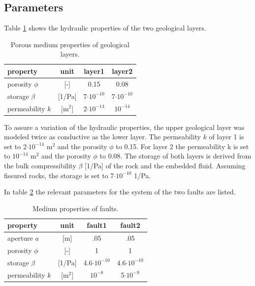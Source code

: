 \subsection{Parameters}

Table \ref{tab:layers} shows the hydraulic properties of the two geological layers.
\begin{table}[htbp]
    \begin{center}
        \caption{Porous medium properties of geological layers.}
        \begin{tabular}{lccc}
          \hline
          property & unit & layer1 & layer2\\
          \hline
          \hline
          porosity $\phi{}$ & [-] & 0.15 & 0.08\\
          storage $\beta{}$ & [1/Pa] & 7$\cdot10^{-10}$ & 7$\cdot10^{-10}$\\
          permeability $k$ & [m$^{2}$] & 2$\cdot10^{-14}$ & $10^{-14}$\\
          \hline
        \end{tabular}
        \label{tab:layers}
    \end{center}
\end{table}

To assure a variation of the hydraulic properties, the upper geological layer was modeled twice as conductive as the lower layer. The permeability $k$ of layer 1 is set to 2$\cdot10^{-14}$ m$^{2}$ and the porosity  $\phi{}$ to 0.15. For layer 2 the permeability k is set to $10^{-14}$ m$^{2}$ and the porosity $\phi{}$ to 0.08. The storage of both layers is derived from the bulk compressibility $\beta{}$ [1/Pa] of the rock and the embedded fluid. Assuming fissured rocks, the storage is set to 7$\cdot10^{-10}$ 1/Pa.

In table \ref{tab:faults} the relevant parameters for the system of the two faults are listed.
\begin{table}[htbp]
    \begin{center}
        \caption{Medium properties of faults.}
        \begin{tabular}{lccc}
          \hline
          property & unit & fault1 & fault2\\
          \hline
          \hline
          aperture $a$ & [m] & .05 & .05\\
          porosity $\phi{}$ & [-] & 1 & 1\\
          storage $\beta{}$ & [1/Pa] & 4.6$\cdot10^{-10}$ & 4.6$\cdot10^{-10}$\\
          permeability $k$ & [m$^2$] & $10^{-8}$ & 5$\cdot10^{-9}$\\
          \hline
        \end{tabular}
        \label{tab:faults}
    \end{center}
\end{table}

